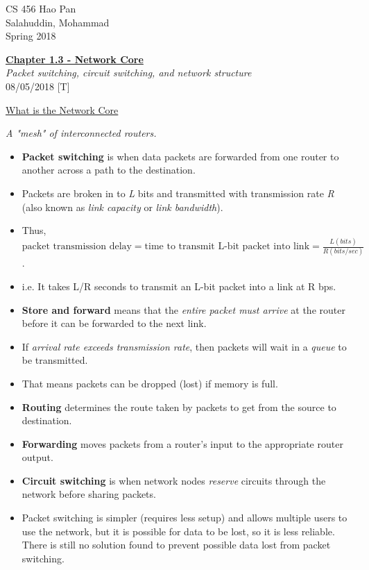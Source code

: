 \documentclass{article}
\begin{document}
\noindent
{CS 456 \hfill Hao Pan}\\
{Salahuddin, Mohammad}\\
{Spring 2018}


\begin{center}
\underline{\large \bf Chapter 1.3 - Network Core}\\

{\it Packet switching, circuit switching, and network structure}\\

\noindent
{\hfill 08/05/2018 [T]}
\end{center}

\underline{What is the Network Core}\\
\vspace{-4mm}

{\it A "mesh" of interconnected routers.}

\begin{itemize}
\item {\bf Packet switching} is when data packets are forwarded from one router to another across a path to the destination.
\item Packets are broken in to {\it L} bits and transmitted with transmission rate {\it R} (also known as {\it link capacity} or {\it link bandwidth}).
\item Thus, $\text{packet transmission delay} = \text{time to transmit L-bit packet into link} = \frac{L (bits)}{R(bits/sec)}$.
\item i.e. It takes L/R seconds to transmit an L-bit packet into a link at R bps.
\item {\bf Store and forward} means that the {\it entire packet must arrive} at the router before it can be forwarded to the next link.
\item If {\it arrival rate exceeds transmission rate}, then packets will wait in a {\it queue} to be transmitted.
\item That means packets can be dropped (lost) if memory is full.
\item {\bf Routing} determines the route taken by packets to get from the source to destination.
\item {\bf Forwarding} moves packets from a router's input to the appropriate router output.
\item {\bf Circuit switching} is when network nodes {\it reserve} circuits through the network before sharing packets.
\item Packet switching is simpler (requires less setup) and allows multiple users to use the network, but it is possible for data to be lost, so it is less reliable. There is still no solution found to prevent possible data lost from packet switching.
\end{itemize}
\end{document}
